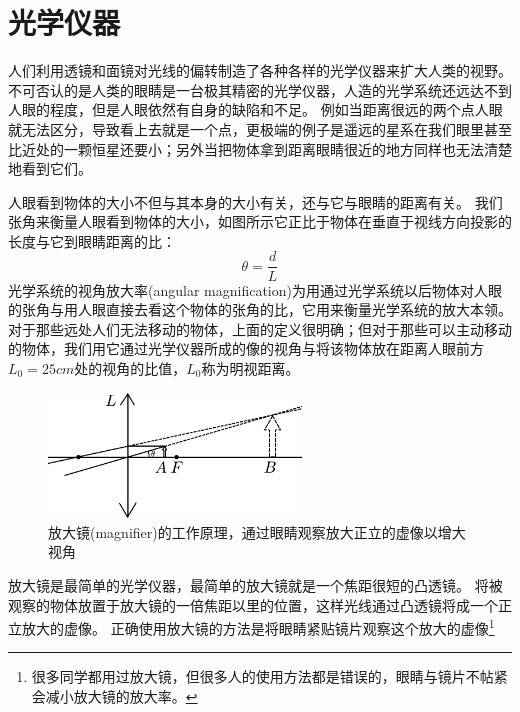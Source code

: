 \section{光学仪器}
人们利用透镜和面镜对光线的偏转制造了各种各样的光学仪器来扩大人类的视野。
不可否认的是人类的眼睛是一台极其精密的光学仪器，人造的光学系统还远达不到人眼的程度，但是人眼依然有自身的缺陷和不足。
例如当距离很远的两个点人眼就无法区分，导致看上去就是一个点，更极端的例子是遥远的星系在我们眼里甚至比近处的一颗恒星还要小；另外当把物体拿到距离眼睛很近的地方同样也无法清楚地看到它们。

人眼看到物体的大小不但与其本身的大小有关，还与它与眼睛的距离有关。
我们张角来衡量人眼看到物体的大小，如图所示它正比于物体在垂直于视线方向投影的长度与它到眼睛距离的比：
\begin{equation}
\theta = \frac{d}{L}
\end{equation}
光学系统的{\heiti 视角放大率}(angular magnification)为用通过光学系统以后物体对人眼的张角与用人眼直接去看这个物体的张角的比，它用来衡量光学系统的放大本领。
对于那些远处人们无法移动的物体，上面的定义很明确；但对于那些可以主动移动的物体，我们用它通过光学仪器所成的像的视角与将该物体放在距离人眼前方$L_0=25\unit{cm}$处的视角的比值，$L_0$称为明视距离。
\begin{figure}
\begin{center}
\includegraphics[width=0.6\textwidth]{images/enlarge-lense.pdf}
\caption{{\heiti 放大镜}(magnifier)的工作原理，通过眼睛观察放大正立的虚像以增大视角}
\end{center}
\end{figure}
放大镜是最简单的光学仪器，最简单的放大镜就是一个焦距很短的凸透镜。
将被观察的物体放置于放大镜的一倍焦距以里的位置，这样光线通过凸透镜将成一个正立放大的虚像。
正确使用放大镜的方法是将眼睛紧贴镜片观察这个放大的虚像\footnote{很多同学都用过放大镜，但很多人的使用方法都是错误的，眼睛与镜片不帖紧会减小放大镜的放大率。}

